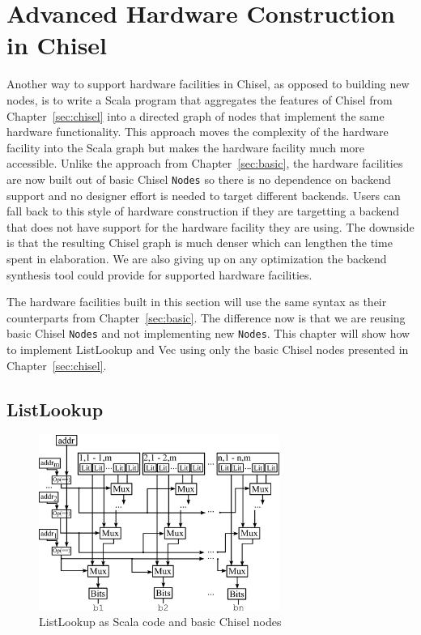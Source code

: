 \section{Advanced Hardware Construction in Chisel}
\label{sec:advanced}
Another way to support hardware facilities in Chisel, as opposed to
building new nodes, is to write a Scala program that aggregates the
features of Chisel from Chapter~\ref{sec:chisel} into a directed graph
of nodes that implement the same hardware functionality. This approach
moves the complexity of the hardware facility into the Scala graph but
makes the hardware facility much more accessible.
Unlike the approach from Chapter~\ref{sec:basic}, the
hardware facilities are now built out of basic Chisel {\tt Nodes} so
there is no dependence on backend support and no designer effort is
needed to target different backends. Users can fall back to this style
of hardware construction if they are targetting a backend that does
not have support for the hardware facility they are using. The
downside is that the resulting Chisel graph is much denser which can
lengthen the time spent in elaboration. We are also giving up on any
optimization the backend synthesis tool could provide for supported
hardware facilities.

The hardware facilities built in this section will use the same syntax
as their counterparts from Chapter~\ref{sec:basic}. The difference now
is that we are reusing basic Chisel {\tt Nodes} and not implementing
new {\tt Nodes}. This chapter will show how to implement ListLookup
and Vec using only the basic Chisel nodes presented in
Chapter~\ref{sec:chisel}.

\subsection{ListLookup}
\begin{figure}[htb]
\centering
\includegraphics[width=0.7\textwidth]{figures/listlookupscala.pdf}
\caption{ListLookup as Scala code and basic Chisel nodes}
\label{fig:llscala}
\end{figure}

